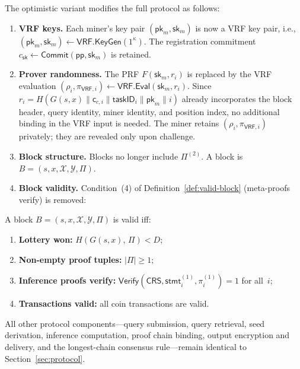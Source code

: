 The optimistic variant modifies the full protocol as follows:
\begin{enumerate}[nosep]
    \item \textbf{VRF keys.} Each miner's key pair $(\mathsf{pk}_m, \mathsf{sk}_m)$ is now a VRF key pair, i.e., $(\mathsf{pk}_m, \mathsf{sk}_m) \leftarrow \mathsf{VRF.KeyGen}(1^\kappa)$. The registration commitment $c_{\mathsf{sk}} \leftarrow \mathsf{Commit}(\mathsf{pp}, \mathsf{sk}_m)$ is retained.
    \item \textbf{Prover randomness.} The PRF $F(\mathsf{sk}_m, r_i)$ is replaced by the VRF evaluation $(\rho_i, \pi_{\mathsf{VRF},i}) \leftarrow \mathsf{VRF.Eval}(\mathsf{sk}_m, r_i)$. Since $r_i = H(G(s,x) \parallel \mathsf{c}_{c,i} \parallel \mathsf{taskID}_i \parallel \mathsf{pk}_m \parallel i)$ already incorporates the block header, query identity, miner identity, and position index, no additional binding in the VRF input is needed. The miner retains $(\rho_i, \pi_{\mathsf{VRF},i})$ privately; they are revealed only upon challenge.
    \item \textbf{Block structure.} Blocks no longer include $\Pi^{(2)}$. A block is $B = (s, x, \mathcal{X}, \mathcal{Y}, \Pi)$.
    \item \textbf{Block validity.} Condition~(4) of Definition~\ref{def:valid-block} (meta-proofs verify) is removed:
\end{enumerate}

\begin{definition}
\label{def:valid-block-opt}
A block $B = (s,x,\mathcal{X}, \mathcal{Y}, \Pi)$ is valid iff:
\begin{enumerate}[nosep]
    \item \textbf{Lottery won:} $H(G(s,x),\, \Pi) < D$;
    \item \textbf{Non-empty proof tuples:} $|\Pi| \ge 1$;
    \item \textbf{Inference proofs verify:} $\mathsf{Verify}(\mathsf{CRS}, \mathsf{stmt}_i^{(1)}, \pi_i^{(1)}) = 1$ for all~$i$;
    \item \textbf{Transactions valid:} all coin transactions are valid.
\end{enumerate}
\end{definition}

All other protocol components---query submission, query retrieval, seed derivation, inference computation, proof chain binding, output encryption and delivery, and the longest-chain consensus rule---remain identical to Section~\ref{sec:protocol}.

